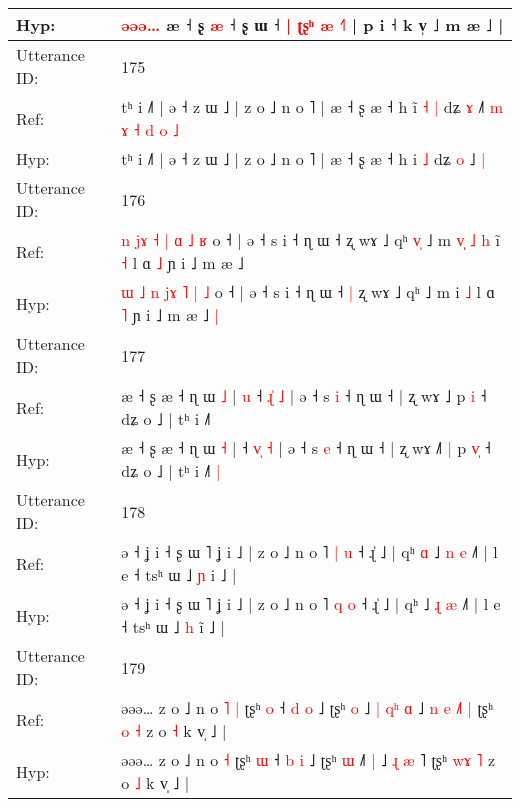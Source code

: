 \documentclass[10pt]{article}
\DeclareRobustCommand{\hl}[1]{{\textcolor{red}{#1}}}
\begin{document}
\begin{longtable}{ll}
 \\
Hyp: & \hl{}\hl{ə}\hl{ə}\hl{ə}\hl{…} æ ˧ \hl{}ʂ\hl{} \hl{æ} ˧\hl{}\hl{} \hl{}ʂ\hl{} ɯ ˧ \hl{|} \hl{ʈ}\hl{ʂ}\hl{ʰ} \hl{æ} \hl{}\hl{˧}˥ | p i ˧ k v̩ ˩ m æ ˩ |
 \\
\midrule
Utterance ID: & 175 \\
Ref: & tʰ i ˩˥ | ə ˧ z ɯ ˩ | z o ˩ n o ˥ | æ ˧ ʂ æ ˧ h i\hl{̃}\hl{ }\hl{˧} \hl{|} dʑ \hl{ɤ} ˩\hl{˥}\hl{ }\hl{m}\hl{ }\hl{ɤ}\hl{ }\hl{˧}\hl{ }\hl{d}\hl{ }\hl{o} \hl{˩}
 \\
Hyp: & tʰ i ˩˥ | ə ˧ z ɯ ˩ | z o ˩ n o ˥ | æ ˧ ʂ æ ˧ h i\hl{}\hl{}\hl{} \hl{˩} dʑ \hl{o} ˩\hl{}\hl{}\hl{}\hl{}\hl{}\hl{}\hl{}\hl{}\hl{}\hl{}\hl{} \hl{|}
 \\
\midrule
Utterance ID: & 176 \\
Ref: & \hl{n} \hl{j}\hl{ɤ} \hl{˧} \hl{}\hl{|} \hl{ɑ} \hl{˩} \hl{ʁ} o ˧ | ə ˧ s i ˧ ɳ ɯ ˧\hl{}\hl{} ʐ wɤ ˩ qʰ\hl{ }\hl{v}\hl{̩} ˩ m\hl{ }\hl{v}\hl{̩}\hl{ }\hl{˩}\hl{ }\hl{h} i\hl{̃} \hl{˧} l ɑ \hl{˩} ɲ i ˩ m æ ˩\hl{}\hl{}
 \\
Hyp: & \hl{ɯ} \hl{}\hl{˩} \hl{n} \hl{j}\hl{ɤ} \hl{˥} \hl{|} \hl{˩} o ˧ | ə ˧ s i ˧ ɳ ɯ ˧\hl{ }\hl{|} ʐ wɤ ˩ qʰ\hl{}\hl{}\hl{} ˩ m\hl{}\hl{}\hl{}\hl{}\hl{}\hl{}\hl{} i\hl{} \hl{˩} l ɑ \hl{˥} ɲ i ˩ m æ ˩\hl{ }\hl{|}
 \\
\midrule
Utterance ID: & 177 \\
Ref: & æ ˧ ʂ æ ˧ ɳ ɯ \hl{˩} |\hl{ }\hl{u} ˧ \hl{ɻ}\hl{̍} \hl{˩} | ə ˧ s \hl{i} ˧ ɳ ɯ ˧ | ʐ wɤ ˩\hl{}\hl{}\hl{} p \hl{}\hl{i} ˧ dʑ o ˩ | tʰ i ˩˥\hl{}\hl{}
 \\
Hyp: & æ ˧ ʂ æ ˧ ɳ ɯ \hl{˧} |\hl{}\hl{} ˧ \hl{v}\hl{̩} \hl{˧} | ə ˧ s \hl{e} ˧ ɳ ɯ ˧ | ʐ wɤ ˩\hl{˥}\hl{ }\hl{|} p \hl{v}\hl{̩} ˧ dʑ o ˩ | tʰ i ˩˥\hl{ }\hl{|}
 \\
\midrule
Utterance ID: & 178 \\
Ref: & ə ˧ ʝ i ˧ ʂ ɯ ˥ ʝ i ˩ | z o ˩ n o ˥ \hl{|} \hl{u} ˧ ɻ̍ ˩ | qʰ\hl{ }\hl{ɑ} ˩ \hl{n} \hl{e} ˩˥ | l e ˧ tsʰ ɯ ˩ \hl{ɲ} i\hl{} ˩ |
 \\
Hyp: & ə ˧ ʝ i ˧ ʂ ɯ ˥ ʝ i ˩ | z o ˩ n o ˥ \hl{q} \hl{o} ˧ ɻ̍ ˩ | qʰ\hl{}\hl{} ˩ \hl{ɻ} \hl{æ} ˩˥ | l e ˧ tsʰ ɯ ˩ \hl{h} i\hl{̃} ˩ |
 \\
\midrule
Utterance ID: & 179 \\
Ref: & əəə… z o ˩ n o\hl{ }\hl{˥} \hl{|} ʈʂʰ \hl{o} ˧ \hl{d} \hl{o} ˩ ʈʂʰ \hl{o} ˩\hl{ }\hl{|}\hl{ }\hl{q}\hl{ʰ} \hl{ɑ} ˩ \hl{n} \hl{e} \hl{˩}˥\hl{ }\hl{|} ʈʂʰ \hl{}\hl{o} \hl{˧} z o \hl{˧} k v̩ ˩ |
 \\
Hyp: & əəə… z o ˩ n o\hl{}\hl{} \hl{˧} ʈʂʰ \hl{ɯ} ˧ \hl{b} \hl{i} ˩ ʈʂʰ \hl{ɯ} ˩\hl{}\hl{}\hl{}\hl{}\hl{˥} \hl{|} ˩ \hl{ɻ} \hl{æ} \hl{}˥\hl{}\hl{} ʈʂʰ \hl{w}\hl{ɤ} \hl{˥} z o \hl{˩} k v̩ ˩ |

\end{longtable}
\end{document}
